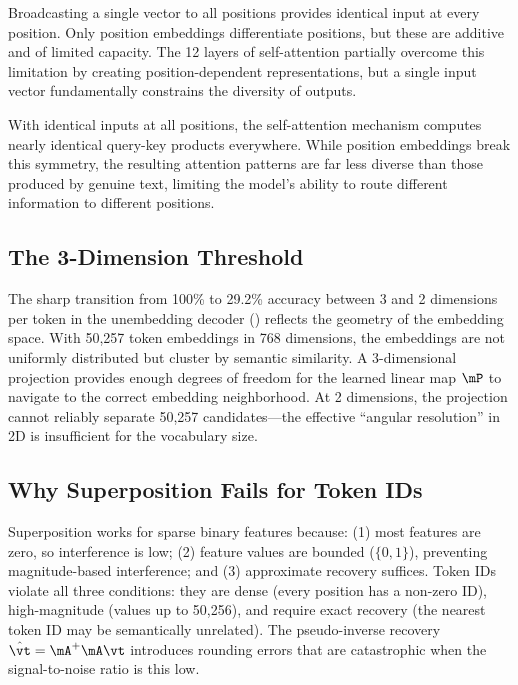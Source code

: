  Broadcasting a single \memvec vector to all positions provides identical input at every position. Only position embeddings differentiate positions, but these are additive and of limited capacity. The 12 layers of self-attention partially overcome this limitation by creating position-dependent representations, but a single input vector fundamentally constrains the diversity of outputs.

 With identical inputs at all positions, the self-attention mechanism computes nearly identical query-key products everywhere. While position embeddings break this symmetry, the resulting attention patterns are far less diverse than those produced by genuine text, limiting the model's ability to route different information to different positions.

\subsection{The 3-Dimension Threshold}

The sharp transition from 100\% to 29.2\% accuracy between 3 and 2 dimensions per token in the unembedding decoder () reflects the geometry of the embedding space. With 50,257 token embeddings in 768 dimensions, the embeddings are not uniformly distributed but cluster by semantic similarity. A 3-dimensional projection provides enough degrees of freedom for the learned linear map $\mP$ to navigate to the correct embedding neighborhood. At 2 dimensions, the projection cannot reliably separate 50,257 candidates---the effective ``angular resolution'' in 2D is insufficient for the vocabulary size.

\subsection{Why Superposition Fails for Token IDs}

Superposition works for sparse binary features because: (1) most features are zero, so interference is low; (2) feature values are bounded ($\{0, 1\}$), preventing magnitude-based interference; and (3) approximate recovery suffices. Token IDs violate all three conditions: they are dense (every position has a non-zero ID), high-magnitude (values up to 50,256), and require exact recovery (the nearest token ID may be semantically unrelated). The pseudo-inverse recovery $\hat{\vt} = \mA^+ \mA \vt$ introduces rounding errors that are catastrophic when the signal-to-noise ratio is this low.

